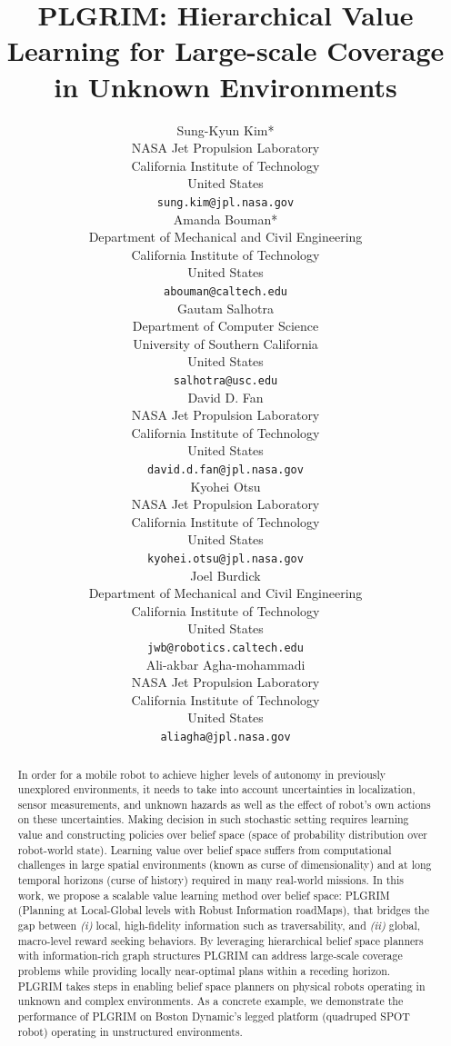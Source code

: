 \documentclass{article}
\title{
PLGRIM: Hierarchical Value Learning for Large-scale Coverage in Unknown Environments
}
\author{
  Sung-Kyun Kim*\\
  NASA Jet Propulsion Laboratory\\
  California Institute of Technology\\
  United States\\
  \texttt{sung.kim@jpl.nasa.gov} \\
  \And
  Amanda Bouman*\\
  Department of Mechanical and Civil Engineering\\
  California Institute of Technology\\
  United States\\
  \texttt{abouman@caltech.edu} \\
  \And
  Gautam Salhotra\\
  Department of Computer Science\\
  University of Southern California\\
  United States\\
  \texttt{salhotra@usc.edu} \\
  \And
  David D. Fan\\
  NASA Jet Propulsion Laboratory\\
  California Institute of Technology\\
  United States\\
  \texttt{david.d.fan@jpl.nasa.gov} \\
  \And
  Kyohei Otsu\\
  NASA Jet Propulsion Laboratory\\
  California Institute of Technology\\
  United States\\
  \texttt{kyohei.otsu@jpl.nasa.gov} \\
  \And
  Joel Burdick\\
  Department of Mechanical and Civil Engineering\\
  California Institute of Technology\\
  United States\\
  \texttt{jwb@robotics.caltech.edu} \\
  \And
  Ali-akbar Agha-mohammadi\\
  NASA Jet Propulsion Laboratory\\
  California Institute of Technology\\
  United States\\
  \texttt{aliagha@jpl.nasa.gov} \\
}
\begin{document}
\maketitle


\begin{abstract}
In order for a mobile robot to achieve higher levels of autonomy in previously unexplored environments, it needs to take into account uncertainties in localization, sensor measurements, and unknown hazards as well as the effect of robot's own actions on these uncertainties. 
%
Making decision in such stochastic setting requires learning value and constructing policies over belief space (space of probability distribution over robot-world state). 
%
Learning value over belief space suffers from computational challenges in large spatial environments (known as curse of dimensionality) and at long temporal horizons (curse of history) required in many real-world missions. %
In this work, we propose a scalable value learning method over belief space: PLGRIM (Planning at Local-Global levels with Robust Information roadMaps), that bridges the gap between \textit{(i)} local, high-fidelity information such as traversability, and \textit{(ii)} global, macro-level reward seeking behaviors.
%
By leveraging hierarchical belief space planners with information-rich graph structures PLGRIM can address large-scale coverage problems while providing locally near-optimal plans within a receding horizon.
PLGRIM takes steps in enabling belief space planners %
on physical robots operating in unknown and complex environments. 
%
As a concrete example, we demonstrate the performance of PLGRIM on Boston Dynamic's legged platform (quadruped SPOT robot) operating in unstructured environments.


\end{abstract}
\end{document}
